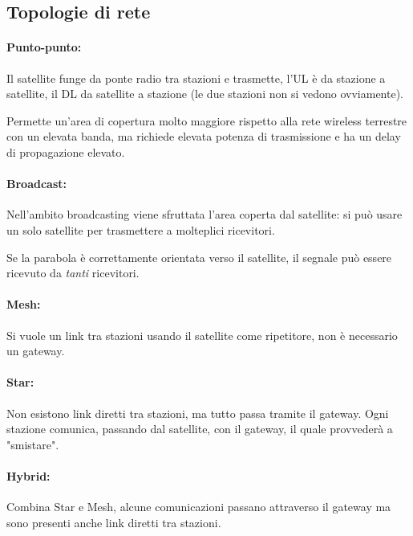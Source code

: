 \subsection{Topologie di rete}

\paragraph{Punto-punto:} Il satellite funge da ponte radio tra stazioni e trasmette, l'UL è da stazione a satellite, il DL da satellite a stazione (le due stazioni non si vedono ovviamente). 

Permette un'area di copertura molto maggiore rispetto alla rete wireless terrestre con un elevata banda, ma richiede elevata potenza di trasmissione e ha un delay di propagazione elevato.

\paragraph{Broadcast:} Nell'ambito broadcasting viene sfruttata l'area coperta dal satellite: si può usare un solo satellite per trasmettere a molteplici ricevitori. 

Se la parabola è correttamente orientata verso il satellite, il segnale può essere ricevuto da \textit{tanti} ricevitori.

\paragraph{Mesh:} Si vuole un link tra stazioni usando il satellite come ripetitore, non è necessario un gateway.

\paragraph{Star:} Non esistono link diretti tra stazioni, ma tutto passa tramite il gateway. Ogni stazione comunica, passando dal satellite, con il gateway, il quale provvederà a "smistare".

\paragraph{Hybrid:} Combina Star e Mesh, alcune comunicazioni passano attraverso il gateway ma sono presenti anche link diretti tra stazioni.

